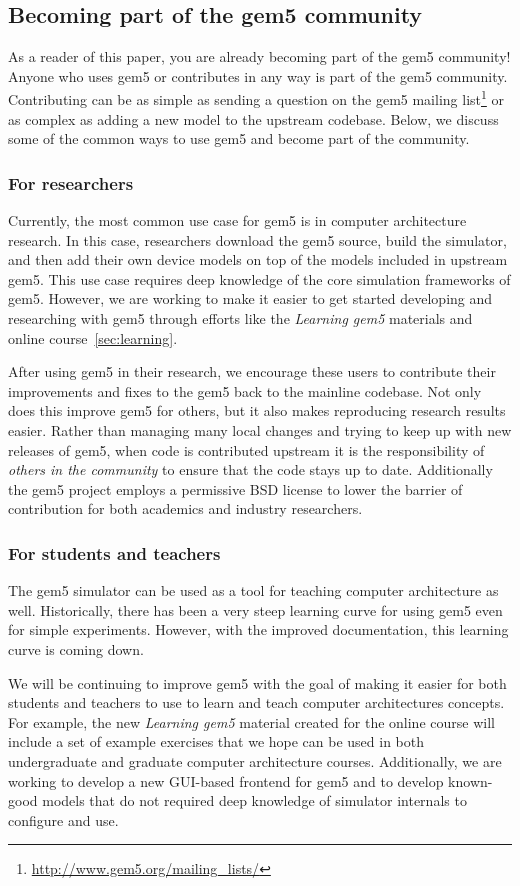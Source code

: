 \subsection{Becoming part of the gem5 community}

As a reader of this paper, you are already becoming part of the gem5 community!
Anyone who uses gem5 or contributes in any way is part of the gem5 community.
Contributing can be as simple as sending a question on the gem5 mailing list\footnote{\url{http://www.gem5.org/mailing_lists/}} or as complex as adding a new model to the upstream codebase.
Below, we discuss some of the common ways to use gem5 and become part of the community.

\subsubsection{For researchers}

Currently, the most common use case for gem5 is in computer architecture research.
In this case, researchers download the gem5 source, build the simulator, and then add their own device models on top of the models included in upstream gem5.
This use case requires deep knowledge of the core simulation frameworks of gem5.
However, we are working to make it easier to get started developing and researching with gem5 through efforts like the \emph{Learning gem5} materials and online course~\ref{sec:learning}.

After using gem5 in their research, we encourage these users to contribute their improvements and fixes to the gem5 back to the mainline codebase.
Not only does this improve gem5 for others, but it also makes reproducing research results easier.
Rather than managing many local changes and trying to keep up with new releases of gem5, when code is contributed upstream it is the responsibility of \emph{others in the community} to ensure that the code stays up to date.
Additionally the gem5 project employs a permissive BSD license to lower the barrier of contribution for both academics and industry researchers.

\subsubsection{For students and teachers}

The gem5 simulator can be used as a tool for teaching computer architecture as well.
Historically, there has been a very steep learning curve for using gem5 even for simple experiments.
However, with the improved documentation, this learning curve is coming down.

We will be continuing to improve gem5 with the goal of making it easier for both students and teachers to use to learn and teach computer architectures concepts.
For example, the new \emph{Learning gem5} material created for the online course will include a set of example exercises that we hope can be used in both undergraduate and graduate computer architecture courses.
Additionally, we are working to develop a new GUI-based frontend for gem5 and to develop known-good models that do not required deep knowledge of simulator internals to configure and use.
